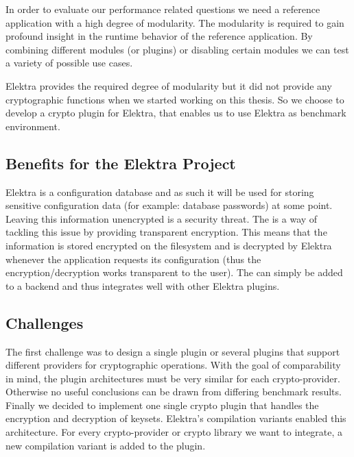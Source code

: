 In order to evaluate our performance related questions we need a reference application with a high degree of modularity.
The modularity is required to gain profound insight in the runtime behavior of the reference application.
By combining different modules (or plugins) or disabling certain modules we can test a variety of possible use cases.

Elektra provides the required degree of modularity but it did not provide any cryptographic functions when we started working on this thesis.
So we choose to develop a crypto plugin for Elektra, that enables us to use Elektra as benchmark environment.

\subsection{Benefits for the Elektra Project}

Elektra is a configuration database and as such it will be used for storing sensitive configuration data (for example: database passwords) at some point.
Leaving this information unencrypted is a security threat.
The \crypto{} is a way of tackling this issue by providing transparent encryption.
This means that the information is stored encrypted on the filesystem and is decrypted by Elektra whenever the application requests its configuration (thus the encryption/decryption works transparent to the user). The \crypto{} can simply be added to a backend and thus integrates well with other Elektra plugins.

\subsection{Challenges}

The first challenge was to design a single plugin or several plugins that support different providers for cryptographic operations.
With the goal of comparability in mind, the plugin architectures must be very similar for each crypto-provider.
Otherwise no useful conclusions can be drawn from differing benchmark results.
Finally we decided to implement one single crypto plugin that handles the encryption and decryption of keysets.
Elektra's compilation variants enabled this architecture.
For every crypto-provider or crypto library we want to integrate, a new compilation variant is added to the plugin.

